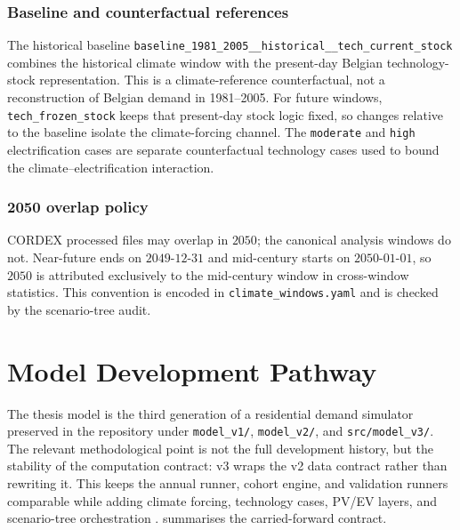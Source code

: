 \subsubsection*{Baseline and counterfactual references} 
The historical baseline \texttt{baseline\_1981\_2005\_\_historical\_\_tech\_current\_stock} combines the historical climate window with the present-day Belgian technology-stock representation. This is a climate-reference counterfactual, not a reconstruction of Belgian demand in 1981--2005. For future windows, \texttt{tech\_frozen\_stock} keeps that present-day stock logic fixed, so changes relative to the baseline isolate the climate-forcing channel. The \texttt{moderate} and \texttt{high} electrification cases are separate counterfactual technology cases used to bound the climate--electrification interaction.
 
\subsubsection*{2050 overlap policy} 
CORDEX processed files may overlap in $2050$; the canonical analysis windows do not. Near-future ends on $2049$-$12$-$31$ and mid-century starts on $2050$-$01$-$01$, so $2050$ is attributed exclusively to the mid-century window in cross-window statistics. This convention is encoded in \texttt{climate\_windows.yaml} and is checked by the scenario-tree audit.



\pagebreak
\section{Model Development Pathway}
\label{sec:model_development_pathway}
 
The thesis model is the third generation of a residential demand simulator preserved in the repository under \texttt{model\_v1/}, \texttt{model\_v2/}, and \texttt{src/model\_v3/}. The relevant methodological point is not the full development history, but the stability of the computation contract: v3 wraps the v2 data contract rather than rewriting it. This keeps the annual runner, cohort engine, and validation runners comparable while adding climate forcing, technology cases, PV/EV layers, and scenario-tree orchestration \cite{Sandve2013,Wilson2014}.  summarises the carried-forward contract.
 
